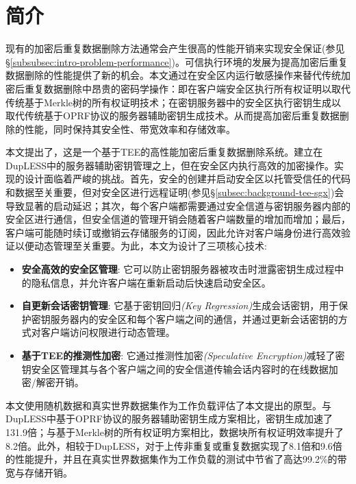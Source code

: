 \section{简介}
\label{sec:sgxdedup-introduction}

现有的加密后重复数据删除方法通常会产生很高的性能开销来实现安全保证(参见\S\ref{subsubsec:intro-problem-performance})。可信执行环境的发展为提高加密后重复数据删除的性能提供了新的机会。本文通过在安全区内运行敏感操作来替代传统加密后重复数据删除中昂贵的密码学操作：即在客户端安全区执行所有权证明以取代传统基于Merkle树的所有权证明技术；在密钥服务器中的安全区执行密钥生成以取代传统基于OPRF协议的服务器辅助密钥生成技术。从而提高加密后重复数据删除的性能，同时保持其安全性、带宽效率和存储效率。

本文提出了\sysnameS，这是一个基于TEE的高性能加密后重复数据删除系统。\sysnameS 建立在DupLESS中的服务器辅助密钥管理之上，但在安全区内执行高效的加密操作。实现\sysnameS 的设计面临着严峻的挑战。首先，安全的创建并启动安全区以托管受信任的代码和数据至关重要，但对安全区进行远程证明(参见\S\ref{subsec:background-tee-sgx})会导致显著的启动延迟；其次，每个客户端都需要通过安全信道与密钥服务器内部的安全区进行通信，但安全信道的管理开销会随着客户端数量的增加而增加；最后，客户端可能随时续订或撤销云存储服务的订阅，因此允许对客户端身份进行高效验证以便动态管理至关重要。为此，本文为\sysnameS 设计了三项核心技术:

\begin{itemize}[leftmargin=0em]
  \item \textbf{安全高效的安全区管理}:
        它可以防止密钥服务器被攻击时泄露密钥生成过程中的隐私信息，并允许客户端在重新启动后快速启动安全区。
  \item \textbf{自更新会话密钥管理}:
        它基于密钥回归\textit{(Key Regression)}生成会话密钥，用于保护密钥服务器内的安全区和每个客户端之间的通信，并通过更新会话密钥的方式对客户端访问权限进行动态管理。
  \item \textbf{基于TEE的推测性加密}:
        它通过推测性加密\textit{(Speculative Encryption)}减轻了密钥安全区管理其与各个客户端之间的安全信道传输会话内容时的在线数据加密/解密开销。
\end{itemize}

本文使用随机数据和真实世界数据集作为工作负载评估了本文提出的\sysnameS 原型。与DupLESS中基于OPRF协议的服务器辅助密钥生成方案相比，密钥生成加速了131.9倍；与基于Merkle树的所有权证明方案相比，数据块所有权证明效率提升了8.2倍。此外，相较于DupLESS，\sysnameS 对于上传非重复或重复数据实现了8.1倍和9.6倍的性能提升，并且在真实世界数据集作为工作负载的测试中节省了高达99.2\%的带宽与存储开销。

